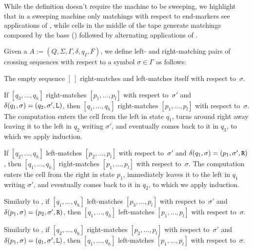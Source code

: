 While the definition doesn't require the machine to be sweeping, we highlight that in a sweeping machine only matchings with respect to end-markers see applications of , while cells in the middle of the tape generate matchings composed by the base () followed by alternating applications of .
\begin{defn}
	Given a \kDLA $A:=(Q,\Sigma,\Gamma,\delta,q_I,F)$, we define left- and right-matching pairs of crossing sequences with respect to a symbol $\sigma\in\Gamma$ as follows:
	\begin{rules}
		\item \label{itm:crossmatchswepDLA-1} The empty sequence $[~]$ right-matches and left-matches itself with respect to~$\sigma$.
		\item \label{itm:crossmatchswepDLA-2} If $[q_3,\dots,q_h]$ right-matches $[p_1,\dots,p_l]$ with respect to~$\sigma'$ and $\delta(q_1,\sigma)=(q_2,\sigma',\mathtt L)$, then $[q_1,\dots,q_h]$ right-matches $[p_1,\dots,p_l]$ with respect to~$\sigma$.
		The computation enters the cell from the left in state $q_1$, turns around right away leaving it to the left in $q_2$ writing $\sigma'$, and eventually comes back to it in $q_3$, to which we apply induction.
		\item \label{itm:crossmatchswepDLA-3} If $[q_2,\dots,q_h]$ left-matches $[p_2,\dots,p_l]$ with respect to~$\sigma'$ and $\delta(q_1,\sigma)=(p_1,\sigma',\mathtt R)$, then $[q_1,\dots,q_h]$ right-matches $[p_1,\dots,p_l]$ with respect to~$\sigma$.
		The computation enters the cell from the right in state $p_1$, immediately leaves it to the left in $q_1$ writing $\sigma'$, and eventually comes back to it in $q_2$, to which we apply induction.
		\item \label{itm:crossmatchswepDLA-4} Similarly to , if $[q_1,\dots,q_h]$ left-matches $[p_3,\dots,p_l]$ with respect to~$\sigma'$ and $\delta(p_1,\sigma)=(p_2,\sigma',\mathtt R)$, then $[q_1,\dots,q_h]$ left-matches $[p_1,\dots,p_l]$ with respect to~$\sigma$.
		\item \label{itm:crossmatchswepDLA-5} Similarly to , if $[q_2,\dots,q_h]$ right-matches $[p_2,\dots,p_l]$ with respect to~$\sigma'$ and $\delta(p_1,\sigma)=(q_1,\sigma',\mathtt L)$, then $[q_1,\dots,q_h]$ left-matches $[p_1,\dots,p_l]$ with respect to~$\sigma$.
	\end{rules}
\end{defn}


